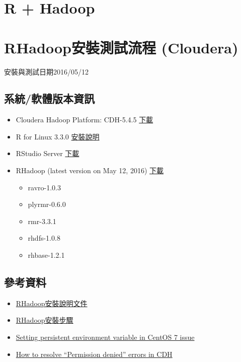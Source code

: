 \documentclass[]{book}
\providecommand{\tightlist}{%
  \setlength{\itemsep}{0pt}\setlength{\parskip}{0pt}}
\theoremstyle{definition}
\theoremstyle{definition}
\theoremstyle{remark}
\begin{document}
\section{R + Hadoop}\label{r-hadoop}

\section{RHadoop安裝測試流程 (Cloudera)}\label{rhadoop-cloudera}

安裝與測試日期2016/05/12

\subsection{系統/軟體版本資訊}

\begin{itemize}
\tightlist
\item
  Cloudera Hadoop Platform: CDH-5.4.5
  \href{http://www.cloudera.com/downloads/cdh/5-4-5.html}{下載}
\item
  R for Linux 3.3.0
  \href{https://cran.rstudio.com/bin/linux/redhat/README}{安裝說明}
\item
  RStudio Server
  \href{https://www.rstudio.com/products/rstudio/download-server/}{下載}
\item
  RHadoop (latest version on May 12, 2016)
  \href{https://github.com/RevolutionAnalytics/RHadoop/wiki/Downloads}{下載}

  \begin{itemize}
  \tightlist
  \item
    ravro-1.0.3
  \item
    plyrmr-0.6.0
  \item
    rmr-3.3.1
  \item
    rhdfs-1.0.8
  \item
    rhbase-1.2.1
  \end{itemize}
\end{itemize}

\subsection{參考資料}

\begin{itemize}
\tightlist
\item
  \href{https://github.com/RevolutionAnalytics/RHadoop/wiki/Installing-RHadoop-on-RHEL}{RHadoop安裝說明文件}
\item
  \href{https://bigdatastudy.hackpad.com/ep/pad/static/IADMBeqF0vV}{RHadoop安裝步驟}
\item
  \href{http://unix.stackexchange.com/questions/271514/setting-persistent-environment-variable-in-centos-7-issue}{Setting
  persistent environment variable in CentOS 7 issue}
\item
  \href{https://community.cloudera.com/t5/CDH-Manual-Installation/How-to-resolve-quot-Permission-denied-quot-errors-in-CDH/ta-p/36141}{How
  to resolve ``Permission denied'' errors in CDH}
\end{itemize}
\end{document}
